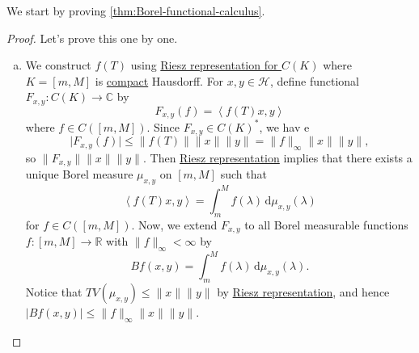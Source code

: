 We start by proving \autoref{thm:Borel-functional-calculus}.
\begin{proof}
	Let's prove this one by one.
	\begin{enumerate}[(a)]
		\item We construct \(f(T)\)  using \hyperref[thm:Riesz-representation-for-C-K]{Riesz representation for \(C(K)\)} where \(K = [m, M]\) is \hyperref[def:compact]{compact} Hausdorff. For \(x, y\in \mathcal{H} \), define functional \(F_{x, y} \colon C(K) \to \mathbb{C} \) by
		      \[
			      F_{x, y} (f) = \left\langle f(T)x, y \right\rangle
		      \]
		      where \(f\in C([m, M])\). Since \(F_{x, y} \in C(K)^{\ast} \), we hav e
		      \[
			      \vert F_{x, y}(f) \vert
			      \leq \lVert f(T) \rVert  \lVert x \rVert \lVert y \rVert
			      = \lVert f \rVert _{\infty } \lVert x \rVert \lVert y \rVert,
		      \]
		      so \(\lVert F_{x, y} \rVert \lVert x \rVert \lVert y \rVert \). Then \hyperref[thm:Riesz-representation-for-C-K]{Riesz representation} implies that there exists a unique Borel measure \(\mu _{x, y} \) on \([m, M]\) such that
		      \[
			      \left\langle f(T) x, y  \right\rangle
			      = \int_{m}^{M} f(\lambda ) \,\mathrm{d}\mu _{x, y}(\lambda )
		      \]
		      for \(f\in C([m, M])\). Now, we extend \(F_{x, y}\) to all Borel measurable functions \(f\colon [m, M] \to \mathbb{R} \) with \(\lVert f \rVert _\infty < \infty \) by
		      \[
			      Bf(x, y) = \int_{m}^{M} f(\lambda ) \,\mathrm{d}\mu _{x, y} (\lambda ).
		      \]
		      Notice that \(TV(\mu _{x, y}) \leq \lVert x \rVert \lVert y \rVert \) by \hyperref[thm:Riesz-representation-for-C-K]{Riesz representation}, and hence \(\vert Bf(x, y) \vert \leq \lVert f \rVert _\infty \lVert x \rVert \lVert y \rVert \).


\end{enumerate}
\end{proof}
